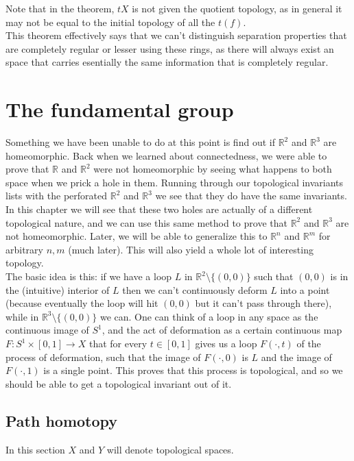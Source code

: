 \documentclass[a4paper]{book}
\theoremstyle{definition}
\theoremstyle{ejemplo}
\theoremstyle{demostracion}
\newcommand{\reales}{\mathbb{R}}
\begin{document}
Note that in the theorem, $tX$ is not given the quotient topology, as in general it may not be equal to the initial topology of all the $t(f)$.\\ 
This theorem effectively says that we can't distinguish separation properties that are completely regular or lesser using these rings, as there will always exist an space that carries esentially the same information that is completely regular.

\chapter{The fundamental group}
Something we have been unable to do at this point is find out if $\reales^2$ and $\reales^3$ are homeomorphic. Back when we learned about connectedness, we were able to prove that $\reales$ and $\reales^2$ were not homeomorphic by seeing what happens to both space when we prick a hole in them. Running through our topological invariants lists with the perforated $\reales^2$ and $\reales^3$ we see that they do have the same invariants. In this chapter we will see that these two holes are actually of a different topological nature, and we can use this same method to prove that $\reales^2$ and $\reales^3$ are not homeomorphic. Later, we will be able to generalize this to $\reales^n$ and $\reales^m$ for arbitrary $n,m$ (much later). This will also yield a whole lot of interesting topology.\\ 
The basic idea is this: if we have a loop $L$ in $\reales^2 \setminus \{(0,0)\}$ such that $(0, 0)$ is in the (intuitive) interior of $L$ then we can't continuously deform $L$ into a point (because eventually the loop will hit $(0, 0)$ but it can't pass through there), while in $\reales^3 \setminus \{(0,0) \}$ we can. One can think of a loop in any space as the continuous image of $S^1$, and the act of deformation as a certain continuous map $F: S^1 \times [0, 1] \rightarrow X$ that for every $t \in [0, 1]$ gives us a loop $F(\cdot, t)$ of the process of deformation, such that the image of $F(\cdot, 0)$ is $L$ and the image of $F(\cdot, 1)$ is a single point. This proves that this process is topological, and so we should be able to get a topological invariant out of it.
\section{Path homotopy}
In this section $X$ and $Y$ will denote topological spaces.\\ 
\end{document}
